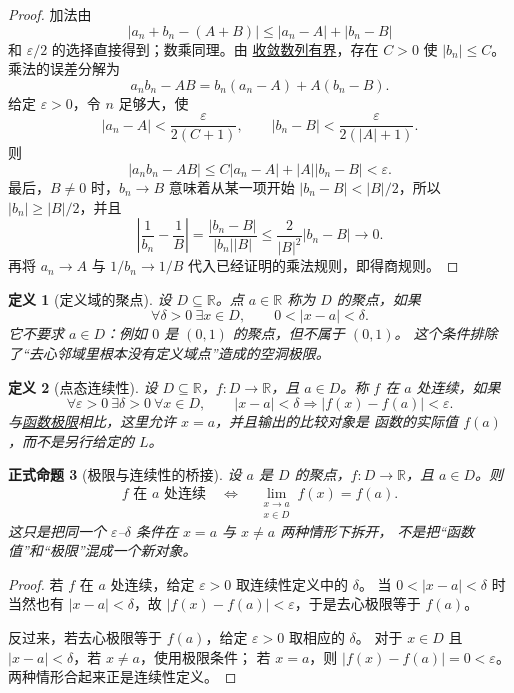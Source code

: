 \documentclass[UTF8,fontset=none,a4paper,11pt]{ctexart}
\theoremstyle{foundation-definition}
\newtheorem{definition}{定义}[section]
\theoremstyle{foundation-theorem}
\theoremstyle{foundation-proposition}
\newtheorem{proposition}[definition]{正式命题}
\theoremstyle{foundation-example}
\theoremstyle{foundation-remark}
\theoremstyle{foundation-theorem}
\newcommand{\term}[2]{\hyperref[#1]{#2}}
\begin{document}
\begin{proof}
加法由
\[
|a_n+b_n-(A+B)|\le |a_n-A|+|b_n-B|
\]
和 \(\varepsilon/2\) 的选择直接得到；数乘同理。由
\term{prop:convergent-sequence-bounded}{收敛数列有界}，存在 \(C>0\) 使
\(|b_n|\le C\)。乘法的误差分解为
\[
a_nb_n-AB=b_n(a_n-A)+A(b_n-B).
\]
给定 \(\varepsilon>0\)，令 \(n\) 足够大，使
\[
|a_n-A|<\frac{\varepsilon}{2(C+1)},\qquad
|b_n-B|<\frac{\varepsilon}{2(|A|+1)}.
\]
则
\[
|a_nb_n-AB|
\le C|a_n-A|+|A||b_n-B|<\varepsilon.
\]
最后，\(B\ne0\) 时，\(b_n\to B\) 意味着从某一项开始
\(|b_n-B|<|B|/2\)，所以 \(|b_n|\ge |B|/2\)，并且
\[
\left|\frac1{b_n}-\frac1B\right|
=\frac{|b_n-B|}{|b_n||B|}
\le \frac{2}{|B|^2}|b_n-B|\longrightarrow0.
\]
再将 \(a_n\to A\) 与 \(1/b_n\to1/B\) 代入已经证明的乘法规则，即得商规则。
\end{proof}

\begin{definition}[定义域的聚点]\label{def:domain-accumulation-point}
设 \(D\subseteq\mathbb R\)。点 \(a\in\mathbb R\) 称为 \(D\) 的聚点，如果
\[
\forall\delta>0\ \exists x\in D,\qquad 0<|x-a|<\delta.
\]
它不要求 \(a\in D\)：例如 \(0\) 是 \((0,1)\) 的聚点，但不属于 \((0,1)\)。
这个条件排除了“去心邻域里根本没有定义域点”造成的空洞极限。
\end{definition}

\begin{definition}[点态连续性]\label{def:pointwise-continuity}
设 \(D\subseteq\mathbb R\)，\(f:D\to\mathbb R\)，且 \(a\in D\)。称 \(f\) 在 \(a\)
处连续，如果
\[
\forall\varepsilon>0\ \exists\delta>0\ \forall x\in D,\qquad
|x-a|<\delta\Longrightarrow |f(x)-f(a)|<\varepsilon.
\]
与\term{def:function-limit}{函数极限}相比，这里允许 \(x=a\)，并且输出的比较对象是
函数的实际值 \(f(a)\)，而不是另行给定的 \(L\)。
\end{definition}

\begin{proposition}[极限与连续性的桥接]\label{prop:limit-continuity-bridge}
设 \(a\) 是 \(D\) 的聚点，\(f:D\to\mathbb R\)，且 \(a\in D\)。则
\[
f\text{ 在 }a\text{ 处连续}
\quad\Longleftrightarrow\quad
\lim_{\substack{x\to a\\x\in D}}f(x)=f(a).
\]
这只是把同一个 \(\varepsilon\)--\(\delta\) 条件在 \(x=a\) 与 \(x\ne a\) 两种情形下拆开，
不是把“函数值”和“极限”混成一个新对象。
\end{proposition}

\begin{proof}
若 \(f\) 在 \(a\) 处连续，给定 \(\varepsilon>0\) 取连续性定义中的 \(\delta\)。
当 \(0<|x-a|<\delta\) 时当然也有 \(|x-a|<\delta\)，故
\(|f(x)-f(a)|<\varepsilon\)，于是去心极限等于 \(f(a)\)。

反过来，若去心极限等于 \(f(a)\)，给定 \(\varepsilon>0\) 取相应的 \(\delta\)。
对于 \(x\in D\) 且 \(|x-a|<\delta\)，若 \(x\ne a\)，使用极限条件；
若 \(x=a\)，则 \(|f(x)-f(a)|=0<\varepsilon\)。两种情形合起来正是连续性定义。
\end{proof}
\end{document}
